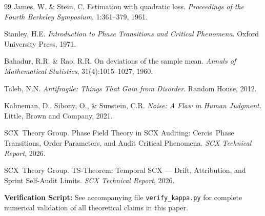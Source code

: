 \documentclass[12pt,a4paper]{article}
\theoremstyle{definition}
\newcommand{\SCX}{\textsf{SCX}}
\newcommand{\Cercis}{\textsf{Cercis}}
\begin{document}
\begin{thebibliography}{99}
James, W. \& Stein, C.
\newblock Estimation with quadratic loss.
\newblock \textit{Proceedings of the Fourth Berkeley Symposium}, 1:361--379, 1961.

Stanley, H.E.
\newblock \textit{Introduction to Phase Transitions and Critical Phenomena}.
\newblock Oxford University Press, 1971.

Bahadur, R.R. \& Rao, R.R.
\newblock On deviations of the sample mean.
\newblock \textit{Annals of Mathematical Statistics}, 31(4):1015--1027, 1960.

Taleb, N.N.
\newblock \textit{Antifragile: Things That Gain from Disorder}.
\newblock Random House, 2012.

Kahneman, D., Sibony, O., \& Sunstein, C.R.
\newblock \textit{Noise: A Flaw in Human Judgment}.
\newblock Little, Brown and Company, 2021.

\SCX\ Theory Group.
\newblock Phase Field Theory in SCX Auditing: \Cercis\ Phase Transitions, Order Parameters, and Audit Critical Phenomena.
\newblock \textit{SCX Technical Report}, 2026.

\SCX\ Theory Group.
\newblock TS-Theorem: Temporal SCX --- Drift, Attribution, and Sprint Self-Audit Limits.
\newblock \textit{SCX Technical Report}, 2026.

\end{thebibliography}

\vspace{1em}
\noindent\textbf{Verification Script:}
See accompanying file \texttt{verify\_kappa.py} for complete numerical validation of all theoretical claims in this paper.
\end{document}
